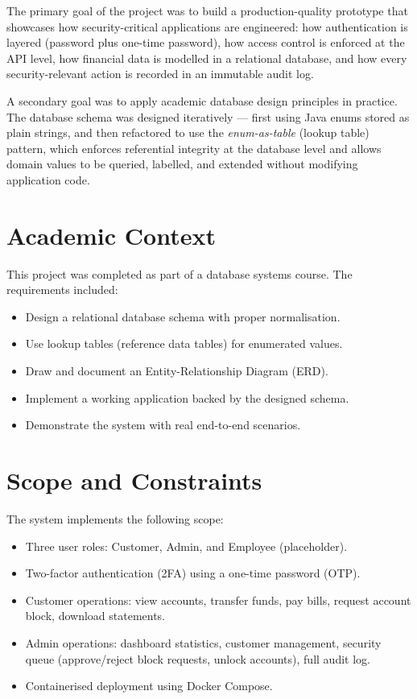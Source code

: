 \documentclass[12pt,a4paper]{report}
\begin{document}
The primary goal of the project was to build a production-quality prototype that
showcases how security-critical applications are engineered: how authentication is
layered (password plus one-time password), how access control is enforced at the API
level, how financial data is modelled in a relational database, and how every
security-relevant action is recorded in an immutable audit log.

A secondary goal was to apply academic database design principles in practice. The
database schema was designed iteratively — first using Java enums stored as plain strings,
and then refactored to use the \emph{enum-as-table} (lookup table) pattern, which
enforces referential integrity at the database level and allows domain values to be
queried, labelled, and extended without modifying application code.

\section{Academic Context}

This project was completed as part of a database systems course. The requirements
included:
\begin{itemize}[noitemsep]
  \item Design a relational database schema with proper normalisation.
  \item Use lookup tables (reference data tables) for enumerated values.
  \item Draw and document an Entity-Relationship Diagram (ERD).
  \item Implement a working application backed by the designed schema.
  \item Demonstrate the system with real end-to-end scenarios.
\end{itemize}

\section{Scope and Constraints}

The system implements the following scope:
\begin{itemize}[noitemsep]
  \item Three user roles: Customer, Admin, and Employee (placeholder).
  \item Two-factor authentication (2FA) using a one-time password (OTP).
  \item Customer operations: view accounts, transfer funds, pay bills, request account
        block, download statements.
  \item Admin operations: dashboard statistics, customer management, security queue
        (approve/reject block requests, unlock accounts), full audit log.
  \item Containerised deployment using Docker Compose.
\end{itemize}
\end{document}
